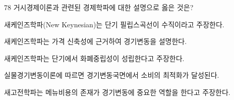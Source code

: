 \begin{question}{78}
거시경제이론과 관련된 경제학파에 대한 설명으로 옳은 것은?
\begin{choices}
  \item 새케인즈학파(New Keynesian)는 단기 필립스곡선이 수직이라고 주장한다.
  \item 새케인즈학파는 가격 신축성에 근거하여 경기변동을 설명한다.
  \item 새케인즈학파는 단기에서 화폐중립성이 성립한다고 주장한다.
  \item 실물경기변동이론에 따르면 경기변동국면에서 소비의 최적화가 달성된다.
  \item 새고전학파는 메뉴비용의 존재가 경기변동에 중요한 역할을 한다고 주장한다.
\end{choices}
\end{question}
